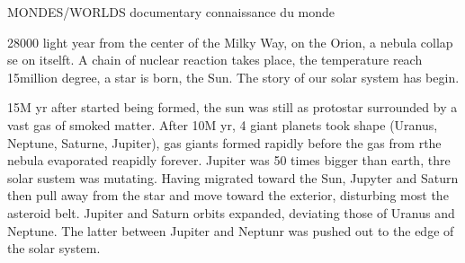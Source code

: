 MONDES/WORLDS documentary connaissance du monde

28000 light year from the center of the Milky Way, on the Orion, a nebula collap
se on itselft.  A chain of nuclear reaction takes place, the temperature reach 15million degree, a star is born, the Sun. The story of our solar system has begin.

15M yr after started being formed, the sun was still as protostar surrounded by a vast gas of smoked matter.
After 10M yr, 4 giant planets took shape (Uranus, Neptune, Saturne, Jupiter), gas giants formed rapidly before the gas from rthe nebula evaporated reapidly forever. Jupiter was 50 times bigger than earth, thre solar sustem was mutating. Having migrated toward the Sun, Jupyter and Saturn then pull away from the star and move toward the exterior, disturbing most the asteroid belt. Jupiter and Saturn orbits expanded, deviating those of Uranus and Neptune. The latter between Jupiter and Neptunr was pushed out to the edge of the solar system. 

